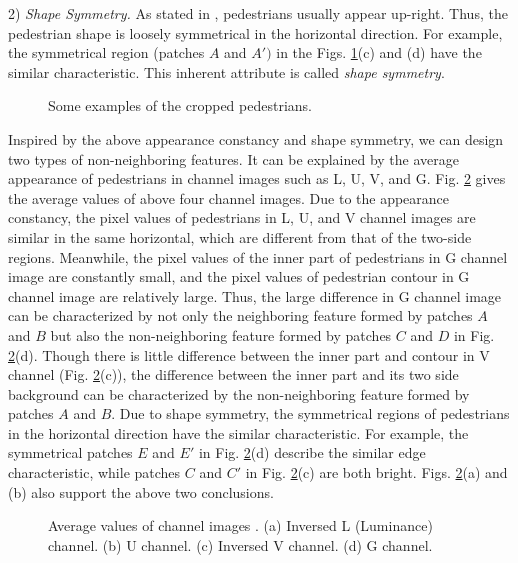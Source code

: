 \documentclass[10pt,twocolumn,letterpaper]{article}
\begin{document}
2) \textit{Shape Symmetry.} As stated in \cite{Zhang_Info.Haar_CVPR_2014}, pedestrians usually appear up-right. Thus, the pedestrian shape is loosely symmetrical in the horizontal direction. For 
example, the symmetrical region (patches $A$ and ${A}')$ in the Figs. \ref{FigSomPed}(c) 
and (d) have the similar characteristic. This inherent attribute is called 
\textit{shape symmetry}.

\begin{figure}[!t]
\centering
{}
\hfil
{}
\hfil
{}
\hfil
{}
\caption{Some examples of the cropped pedestrians.}
\label{FigSomPed}
\end{figure}

Inspired by the above appearance constancy and shape symmetry, we can design 
two types of non-neighboring features. It can be explained by the average 
appearance of pedestrians in channel images such as L, U, V, and G. Fig. \ref{FigAvgPed} 
gives the average values of above four channel images. Due to the appearance constancy, the pixel values of 
pedestrians in L, U, and V channel images are similar in the same horizontal, which are different from that of the two-side regions. Meanwhile, 
the pixel values of the inner part of pedestrians in G channel image are 
constantly small, and the pixel values of pedestrian contour in G channel 
image are relatively large. Thus, the large difference in G channel image 
can be characterized by not only the neighboring feature formed by patches 
$A$ and $B$ but also the non-neighboring feature formed by patches $C$ and 
$D$ in Fig. \ref{FigAvgPed}(d). Though there is little difference between the inner part and contour in V 
channel (Fig. \ref{FigAvgPed}(c)), the difference between the inner part and its two side 
background can be 
characterized by the non-neighboring feature formed by patches 
$A$ and $B$. Due to shape symmetry, the symmetrical regions of pedestrians in the horizontal direction have the similar characteristic. For example, the 
symmetrical patches $E$ and $E'$ in Fig. \ref{FigAvgPed}(d) 
describe the similar edge characteristic, while patches 
$C$ and $C'$ in Fig. \ref{FigAvgPed}(c) are both bright. Figs. \ref{FigAvgPed}(a) and (b) also support the above two conclusions.

\begin{figure}[!t]
\centering
{}
\hfil
{}
\hfil
{}
\hfil
{}
\caption{Average values of channel images . (a) Inversed L (Luminance) channel. (b) U channel. (c) Inversed V channel. (d) G channel.}
\label{FigAvgPed}
\end{figure}
\end{document}
